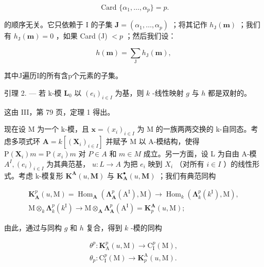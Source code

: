 \[
\text { Card } \{\alpha_ {1}, \dots , \alpha_ {p} \} = p.
\]

的顺序无关。它只依赖于 I 的子集 \(\mathbf{J} = (\alpha_{1},\ldots ,\alpha_{p})\) ；将其记作 \(h_\mathrm{J}(\pmb {m})\) ；我们有 \(h_\mathrm{J}(\pmb {m}) = 0\) ，如果 Card (J) \(< p\) ；然后我们设：

\[
h (\boldsymbol {m}) = \sum_ {\mathrm{J}} h _ {\mathrm{J}} (\boldsymbol {m}),
\]

其中J遍历I的所有含p个元素的子集。

引理 2. --- 若 k-模 \(\mathbf{L}_{0}\) 以 \((e_{i})_{i\in I}\) 为基，则 \(k\) -线性映射 \(g\) 与 \(h\) 都是双射的。

这由 III，第 79 页，定理 1 得出。

现在设 M 为一个 k-模，且 \(\boldsymbol{x} = (x_{i})_{i \in I}\) 为 M 的一族两两交换的 k-自同态。考虑多项式环 \(\mathbf{A} = k[(\mathbf{X}_{i})_{i \in I}]\) 并赋予 M 以 A-模结构，使得 \(\mathrm{P}(\mathbf{X}_{i}) m = \mathrm{P}(x_{i}) m\) 对 \(P \in A\) 和 \(m \in M\) 成立。另一方面，设 L 为自由 A-模 \(A^{I}, (e_{i})_{i \in I}\) 为其典范基， \(u : L \to A\) 为把 \(e_{i}\) 映到 \(X_{i}\) （对所有 \(i \in I\) ）的线性形式。考虑 k-模复形 \(\mathbf{K}^{\mathbf{A}}(u, \mathbf{M})\) 与 \(\mathbf{K}_{\mathbf{A}}^{\bullet}(u, \mathbf{M})\) ；我们有典范同构

\[
\begin{array}{c} \mathbf {K} _ {\mathbf {A}} ^ {p} (u, \mathrm{M}) = \operatorname{Hom} _ {\mathbf {A}} \left(\boldsymbol {\Lambda} _ {\mathbf {A}} ^ {p} (\mathrm{A} ^ {\mathrm{I}}), \mathrm{M}\right) \to \operatorname{Hom} _ {k} \left(\boldsymbol {\Lambda} _ {k} ^ {p} (k ^ {\mathrm{I}}), \mathrm{M}\right), \\ \mathrm{M} \otimes_ {k} \boldsymbol {\Lambda} _ {k} ^ {p} (k ^ {\mathrm{I}}) \to \mathrm{M} \otimes_ {\mathbf {A}} \boldsymbol {\Lambda} _ {\mathbf {A}} ^ {p} (\mathrm{A} ^ {\mathrm{I}}) = \mathbf {K} _ {p} ^ {\mathbf {A}} (u, \mathrm{M}); \end{array}
\]

由此，通过与同构 \(g\) 和 \(h\) 复合，得到 \(k\) -模的同构

\[
\begin{array}{l} \theta^ {p}: \mathbf {K} _ {\mathrm{A}} ^ {p} (u, \mathrm{M}) \to \mathrm{C} _ {\mathrm{I}} ^ {p} (\mathrm{M}), \\ \theta_ {p}: \mathrm{C} _ {\mathrm{I}} ^ {p} (\mathrm{M}) \to \mathbf {K} _ {p} ^ {\mathrm{A}} (u, \mathrm{M}). \end{array}
\]

